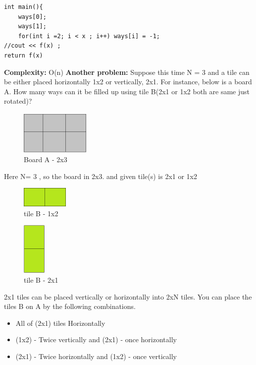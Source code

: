 \documentclass[12pt]{article}
\begin{document}
{\begin{lstlisting}
int main(){
	ways[0];
	ways[1];
	for(int i =2; i < x ; i++) ways[i] = -1;
//cout << f(x) ;
return f(x)
\end{lstlisting}
\textbf{Complexity:} O(n) \vspace{3mm}
\newline
\textbf{Another problem:} \vspace{3mm}\newline  Suppose this time N = 3 and a tile can be either placed horizontally 1x2 or vertically, 2x1.\newline
For instance,  below is a  board A. How many ways can it be  filled up using tile B(2x1 or 1x2 both are same just rotated)?
\begin{figure}[H]
\centering
\includegraphics[width=0.3\textwidth]{3.png}
\caption {Board A - 2x3}
\end{figure}
Here N= 3 , so the board in 2x3.
and given tile(s) is 2x1 or 1x2
\begin{figure}[H]
\centering
\includegraphics[width=0.20\textwidth]{1x2.png}
\caption{tile B - 1x2}
\end{figure}
\begin{figure}[H]
\centering
\includegraphics[width=0.10\textwidth]{2x1.png}
\caption{tile B - 2x1}
\end{figure}
2x1 tiles can be placed vertically or horizontally into 2xN tiles. You can place the tiles B on A by the following combinations.
\begin{itemize}
\item All of (2x1) tiles Horizontally
\item (1x2) - Twice vertically and (2x1) -  once horizontally
\item (2x1) -  Twice horizontally and (1x2) - once vertically

\end{itemize}}
\end{document}
